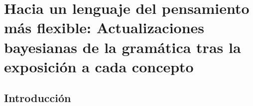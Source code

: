 

\chapter{Hacia un lenguaje del pensamiento más flexible: Actualizaciones bayesianas de la gramática tras la exposición a cada concepto}\label{chapter:PRE}

\section{Introducción}




